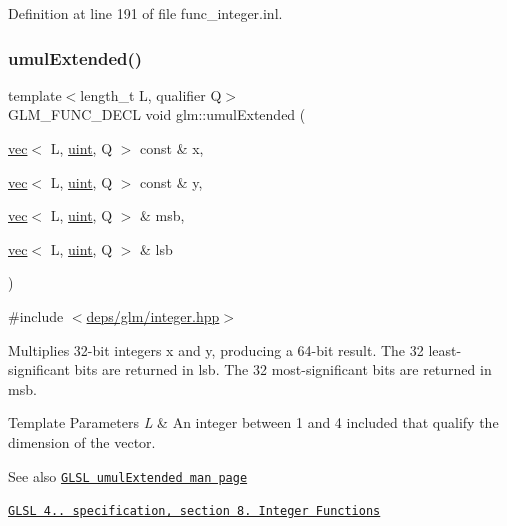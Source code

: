 Definition at line 191 of file func\+\_\+integer.\+inl.

\mbox{\label{group__core__func__integer_ga732e2fb56db57ea541c7e5c92b7121be}} 
\subsubsection{\texorpdfstring{umul\+Extended()}{umulExtended()}}
{\footnotesize\ttfamily template$<$length\+\_\+t L, qualifier Q$>$ \\
G\+L\+M\+\_\+\+F\+U\+N\+C\+\_\+\+D\+E\+CL void glm\+::umul\+Extended (\begin{DoxyParamCaption}\item[{\hyperlink{structglm_1_1vec}{vec}$<$ L, \hyperlink{group__core__precision_ga4fd29415871152bfb5abd588334147c8}{uint}, Q $>$ const \&}]{x,  }\item[{\hyperlink{structglm_1_1vec}{vec}$<$ L, \hyperlink{group__core__precision_ga4fd29415871152bfb5abd588334147c8}{uint}, Q $>$ const \&}]{y,  }\item[{\hyperlink{structglm_1_1vec}{vec}$<$ L, \hyperlink{group__core__precision_ga4fd29415871152bfb5abd588334147c8}{uint}, Q $>$ \&}]{msb,  }\item[{\hyperlink{structglm_1_1vec}{vec}$<$ L, \hyperlink{group__core__precision_ga4fd29415871152bfb5abd588334147c8}{uint}, Q $>$ \&}]{lsb }\end{DoxyParamCaption})}



{\ttfamily \#include $<$\hyperlink{integer_8hpp}{deps/glm/integer.\+hpp}$>$}

Multiplies 32-\/bit integers x and y, producing a 64-\/bit result. The 32 least-\/significant bits are returned in lsb. The 32 most-\/significant bits are returned in msb.


\begin{DoxyTemplParams}{Template Parameters}
{\em L} & An integer between 1 and 4 included that qualify the dimension of the vector.\\
\hline
\end{DoxyTemplParams}
\begin{DoxySeeAlso}{See also}
\href{http://www.opengl.org/sdk/docs/manglsl/xhtml/umulExtended.xml}{\tt G\+L\+SL umul\+Extended man page} 

\href{http://www.opengl.org/registry/doc/GLSLangSpec.4.20.8.pdf}{\tt G\+L\+SL 4.. specification, section 8. Integer Functions} 
\end{DoxySeeAlso}


